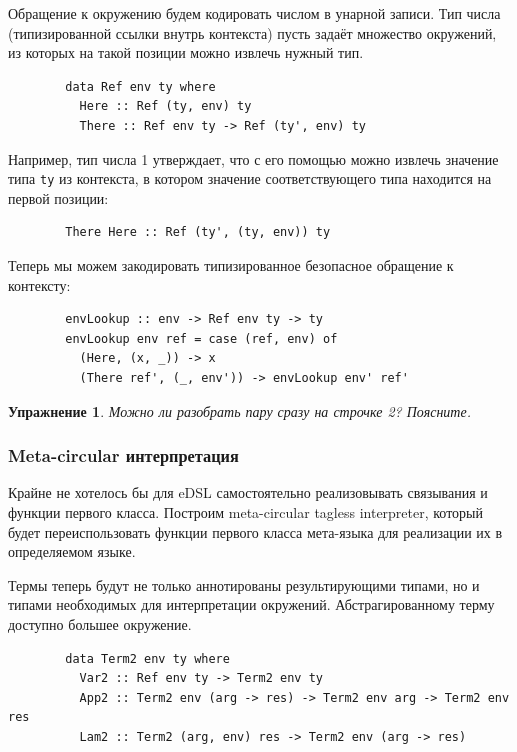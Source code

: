 \documentclass[12pt]{article}
\newtheorem{task}{Упражнение}
\begin{document}
    Обращение к окружению будем кодировать числом в унарной записи.
    Тип числа (типизированной ссылки внутрь контекста) пусть задаёт множество окружений, из которых на такой позиции можно извлечь нужный тип.
    \begin{verbatim}
        data Ref env ty where
          Here :: Ref (ty, env) ty
          There :: Ref env ty -> Ref (ty', env) ty
    \end{verbatim}
    Например, тип числа 1 утверждает, что с его помощью можно извлечь значение типа \texttt{ty} из контекста, в котором значение соответствующего типа находится на первой позиции:
    \begin{verbatim}
        There Here :: Ref (ty', (ty, env)) ty
    \end{verbatim}

    Теперь мы можем закодировать типизированное безопасное обращение к контексту:
    \begin{verbatim}
        envLookup :: env -> Ref env ty -> ty
        envLookup env ref = case (ref, env) of
          (Here, (x, _)) -> x
          (There ref', (_, env')) -> envLookup env' ref'
    \end{verbatim}

    \begin{task}
        Можно ли разобрать пару сразу на строчке 2?
        Поясните.
    \end{task}

    \subsubsection{Meta-circular интерпретация}

    Крайне не хотелось бы для eDSL самостоятельно реализовывать связывания и функции первого класса.
    Построим meta-circular tagless interpreter, который будет переиспользовать функции первого класса мета-языка для реализации их в определяемом языке.

    Термы теперь будут не только аннотированы результирующими типами, но и типами необходимых для интерпретации окружений.
    Абстрагированному терму доступно большее окружение.

    \begin{verbatim}
        data Term2 env ty where
          Var2 :: Ref env ty -> Term2 env ty
          App2 :: Term2 env (arg -> res) -> Term2 env arg -> Term2 env res
          Lam2 :: Term2 (arg, env) res -> Term2 env (arg -> res)
    \end{verbatim}
\end{document}
